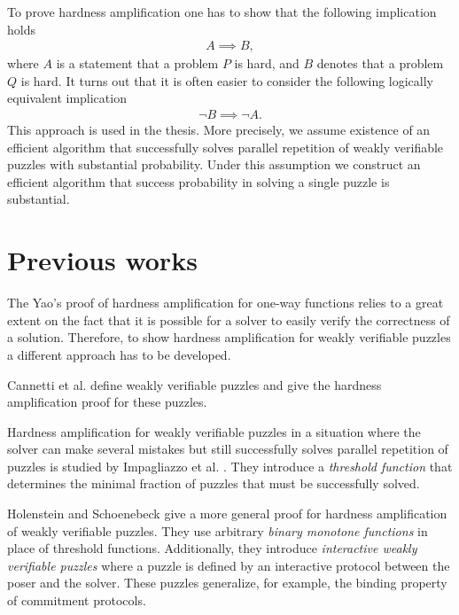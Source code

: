 To prove hardness amplification one has to show that the following implication holds
\begin{align*}
  A \implies B,
\end{align*}
where $A$ is a statement that a problem $P$ is hard, and $B$ denotes that a problem $Q$ is hard.
It turns out that it is often easier to consider the following logically equivalent implication
\begin{align*}
  \lnot B \implies \lnot A.
\end{align*}
This approach is used in the thesis. More precisely, we assume existence of an efficient algorithm that successfully
solves parallel repetition of weakly verifiable puzzles with substantial probability.
Under this assumption we construct an efficient algorithm that success probability in solving a single puzzle is substantial.

\section{Previous works}
The Yao's proof of hardness amplification for one-way functions relies to a great extent on the fact that it is possible
for a solver to easily verify the correctness of a solution. Therefore, to show hardness amplification
for weakly verifiable puzzles a different approach has to be developed.

Cannetti et al. \cite{canetti2005hardness} define weakly verifiable puzzles and give the hardness amplification proof for these puzzles.

Hardness amplification for weakly verifiable puzzles in a situation where the solver can make several mistakes but still
successfully solves parallel repetition of puzzles is studied by Impagliazzo et al. \cite{impagliazzo2007chernoff}.
They introduce a \textit{threshold function} that determines the minimal fraction of puzzles that must be successfully solved.

Holenstein and Schoenebeck \cite{holenstein2011general} give a more general proof for hardness amplification
of weakly verifiable puzzles. They use arbitrary \textit{binary monotone functions} in place of threshold functions.
Additionally, they introduce \textit{interactive weakly verifiable puzzles} where a puzzle is defined by
an interactive protocol between the poser and the solver. These puzzles generalize, for example, the binding property of commitment protocols.

